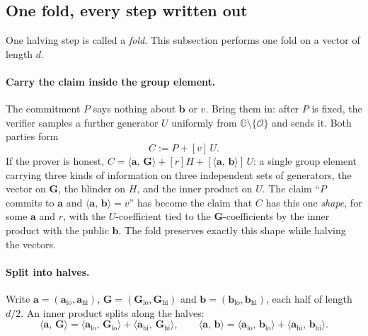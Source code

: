 \documentclass[11pt,a4paper]{article}
\theoremstyle{definition}
\newcommand{\G}{\mathbb{G}}
\newcommand{\ip}[2]{\langle #1,\, #2 \rangle}
\begin{document}
\subsection{One fold, every step written out}
\label{sec:ipa-fold}

One halving step is called a \emph{fold}. This subsection performs one
fold on a vector of length $d$.

\paragraph{Carry the claim inside the group element.}
The commitment $P$ says nothing about $\mathbf b$ or $v$. Bring them in:
after $P$ is fixed, the verifier samples a further generator $U$
uniformly from $\G \setminus \{\mathcal O\}$ and sends it. Both parties
form
\begin{equation}\label{eq:ipa-C}
C := P + [v]\,U .
\end{equation}
If the prover is honest, $C = \ip{\mathbf a}{\mathbf G} + [r]H +
[\ip{\mathbf a}{\mathbf b}]\,U$: a single group element carrying three
kinds of information on three independent sets of generators, the
vector on $\mathbf G$, the blinder on $H$, and the inner product on $U$.
The claim ``$P$ commits to $\mathbf a$ and
$\ip{\mathbf a}{\mathbf b} = v$'' has become the claim that $C$ has this
one \emph{shape}, for some $\mathbf a$ and $r$, with the $U$-coefficient
tied to the $\mathbf G$-coefficients by the inner product with the public
$\mathbf b$. The fold preserves exactly this shape while halving the
vectors.

\paragraph{Split into halves.}
Write $\mathbf a = (\mathbf a_{\mathrm{lo}}, \mathbf a_{\mathrm{hi}})$,
$\mathbf G = (\mathbf G_{\mathrm{lo}}, \mathbf G_{\mathrm{hi}})$ and
$\mathbf b = (\mathbf b_{\mathrm{lo}}, \mathbf b_{\mathrm{hi}})$, each
half of length $d/2$. An inner product splits along the halves:
\[
\ip{\mathbf a}{\mathbf G}
 = \ip{\mathbf a_{\mathrm{lo}}}{\mathbf G_{\mathrm{lo}}}
 + \ip{\mathbf a_{\mathrm{hi}}}{\mathbf G_{\mathrm{hi}}},
\qquad
\ip{\mathbf a}{\mathbf b}
 = \ip{\mathbf a_{\mathrm{lo}}}{\mathbf b_{\mathrm{lo}}}
 + \ip{\mathbf a_{\mathrm{hi}}}{\mathbf b_{\mathrm{hi}}} .
\]
\end{document}
